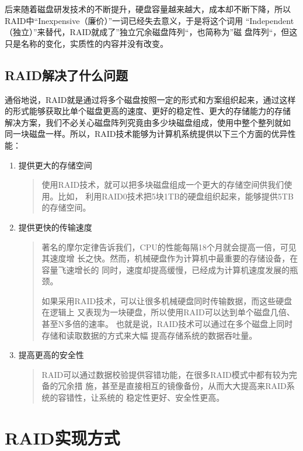 后来随着磁盘研发技术的不断提升，硬盘容量越来越大，成本却不断下降，所以
RAID中“Inexpensive（廉价）”一词已经失去意义，于是将这个词用
“Independent（独立）”来替代，RAID就成了”独立冗余磁盘阵列“，也简称为”磁
盘阵列“，但这只是名称的变化，实质性的内容并没有改变。

\subsection{RAID解决了什么问题}

通俗地说，RAID就是通过将多个磁盘按照一定的形式和方案组织起来，通过这样
的形式能够获取比单个磁盘更高的速度、更好的稳定性、更大的存储能力的存储
解决方案，我们不必关心磁盘阵列究竟由多少块磁盘组成，使用中整个整列就如
同一块磁盘一样。所以，RAID技术能够为计算机系统提供以下三个方面的优异性
能：

\begin{enumerate}[itemsep=0pt,parsep=0pt]
\item 提供更大的存储空间
\begin{quote}
  使用RAID技术，就可以把多块磁盘组成一个更大的存储空间供我们使用。比如，
  利用RAID0技术把5块1TB的硬盘组织起来，能够提供5TB的存储空间。
\end{quote}

\item 提供更快的传输速度
\begin{quote}
  著名的摩尔定律告诉我们，CPU的性能每隔18个月就会提高一倍，可见其速度增
  长之快。然而，机械硬盘作为计算机中最重要的存储设备，在容量飞速增长的
  同时，速度却提高缓慢，已经成为计算机速度发展的瓶颈。

  如果采用RAID技术，可以让很多机械硬盘同时传输数据，而这些硬盘在逻辑上
  又表现为一块硬盘，所以使用RAID可以达到单个磁盘几倍、甚至N多倍的速率。
  也就是说，RAID技术可以通过在多个磁盘上同时存储和读取数据的方式来大幅
  提高存储系统的数据吞吐量。
\end{quote}

\item 提高更高的安全性
\begin{quote}
RAID可以通过数据校验提供容错功能，在很多RAID模式中都有较为完备的冗余措
施，甚至是直接相互的镜像备份，从而大大提高来RAID系统的容错性，让系统的
稳定性更好、安全性更高。
\end{quote}
\end{enumerate}

\section{RAID实现方式}


